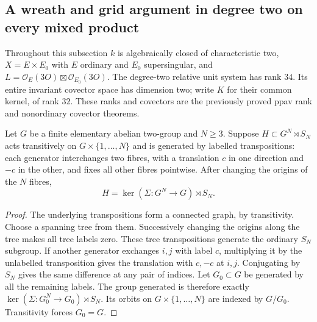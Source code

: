 \subsection{A wreath and grid argument in degree two on every mixed product}
\label{subsec:mixed-degree-two-wreath-grid-candidate}

Throughout this subsection $k$ is algebraically closed of characteristic
two, $X=E\times E_0$ with $E$ ordinary and $E_0$ supersingular, and
$L=\mathcal O_E(3O)\boxtimes\mathcal O_{E_0}(3O)$.
The degree-two relative unit system has rank $34$. Its entire invariant
covector space has dimension two; write $K$ for their common kernel,
of rank $32$. These ranks and covectors are the previously proved
ppav rank and nonordinary covector theorems.

\begin{lemma}
\label{lem:labelled-transposition-wreath-candidate}
Let $G$ be a finite elementary abelian two-group and $N\ge3$.
Suppose $H\subset G^N\rtimes S_N$ acts transitively on
$G\times\{1,\ldots,N\}$ and is generated by labelled transpositions:
each generator interchanges two fibres, with a translation $c$ in
one direction and $-c$ in the other, and fixes all other fibres
pointwise. After changing the origins of the $N$ fibres,
\[
                   H=\ker(\Sigma:G^N\to G)\rtimes S_N.
\]
\end{lemma}
\begin{proof}
The underlying transpositions form a connected graph, by transitivity.
Choose a spanning tree from them. Successively changing the origins
along the tree makes all tree labels zero. These tree transpositions
generate the ordinary $S_N$ subgroup. If another generator exchanges
$i,j$ with label $c$, multiplying it by the unlabelled transposition
gives the translation with $c,-c$ at $i,j$. Conjugating by $S_N$
gives the same difference at any pair of indices.
Let $G_0\subset G$ be generated by all the remaining labels. The
group generated is therefore exactly
$\ker(\Sigma:G_0^N\to G_0)\rtimes S_N$.
Its orbits on $G\times\{1,\ldots,N\}$ are indexed by $G/G_0$.
Transitivity forces $G_0=G$.
\end{proof}


